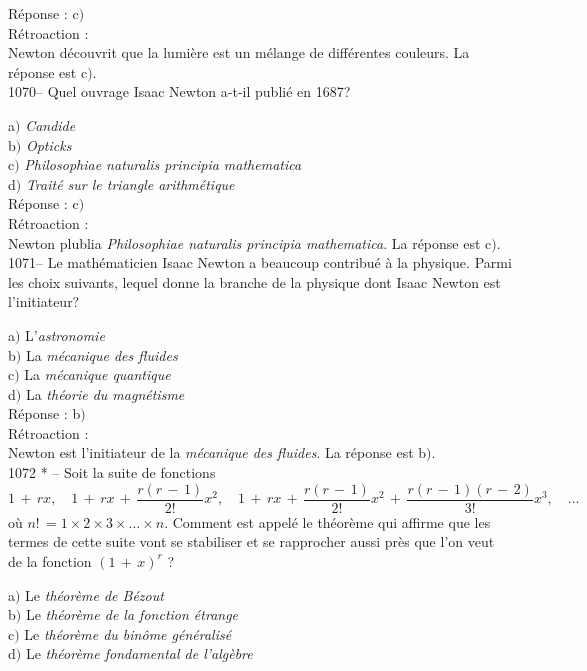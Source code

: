 ﻿\documentclass[letterpaper, 12pt]{article}
\begin{document}
R\'eponse : c$)$ \\

R\'etroaction : \\
Newton d\'ecouvrit que la lumi\`ere est un \og m\'elange de
diff\'erentes couleurs\fg .
La r\'eponse est c$)$.\\

1070-- Quel ouvrage Isaac Newton a-t-il publi\'e en 1687?

a$)$ {\sl Candide} \\
b$)$ {\sl Opticks}  \\
c$)$ {\sl Philosophiae naturalis principia mathematica}  \\
d$)$ {\sl Trait\'e sur le triangle arithm\'etique}\\

R\'eponse : c$)$\\

R\'etroaction : \\
Newton plublia {\sl Philosophiae naturalis principia mathematica}.
La r\'eponse est c$)$.\\

1071-- Le math\'ematicien Isaac Newton a beaucoup contribu\'e \`a la
physique. Parmi les choix suivants, lequel donne la branche de la
physique dont Isaac Newton est l'initiateur?

a$)$ L'{\sl astronomie} \\
b$)$ La {\sl m\'ecanique des fluides}  \\
c$)$ La {\sl m\'ecanique quantique}  \\
d$)$ La {\sl th\'eorie du magn\'etisme}\\

R\'eponse : b$)$\\

R\'etroaction : \\
Newton est l'initiateur de la {\sl m\'ecanique des fluides}.
La r\'eponse est b$)$.\\

1072 * -- Soit la suite de fonctions
$$\displaystyle{1\,+\,rx,\quad 1\,+\,rx\,+\,\frac{r(r\,-\,1)}{2!}x^2,\quad
1\,+\,rx\,+\,\frac{r(r\,-\,1)}{2!}x^2\,+\,\frac{r(r\,-\,1)(r\,-\,2)}{3!}x^3,\quad
\ldots}$$
o\`u $n!\,=1\times2\times3\times\ldots\times n$. Comment est
appel\'e le th\'eor\`eme qui affirme que les termes de cette suite
vont se stabiliser et se rapprocher aussi pr\`es que l'on veut de la
fonction $(1\,+\,x)^r$ ?

a$)$ Le {\sl th\'eor\`eme de B\'ezout} \\
b$)$ Le {\sl th\'eor\`eme de la fonction \'etrange}  \\
c$)$ Le {\sl th\'eor\`eme du bin\^ome g\'en\'eralis\'e}  \\
d$)$ Le {\sl th\'eor\`eme fondamental de l'alg\`ebre}\\
\end{document}
